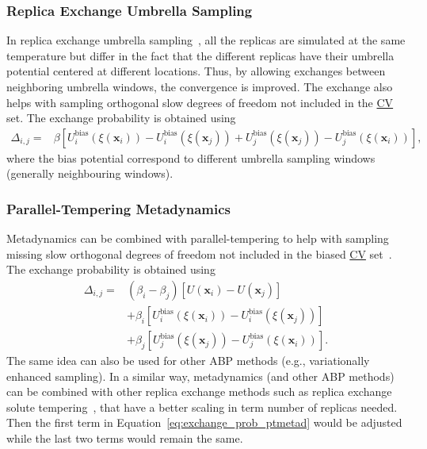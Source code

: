 \documentclass[9pt,review]{livecoms}
\newcommand{\vx}{\mathbf{x}}
\begin{document}
\subsubsection{Replica Exchange Umbrella Sampling}
\label{sec:repex_umbrsampl}
In replica exchange umbrella sampling~\cite{Sugita2000_REUS}, all the replicas are simulated at the same temperature but differ in the fact that the different replicas have their umbrella potential centered at different locations. Thus, by allowing exchanges between neighboring umbrella windows, the convergence is improved. The exchange also helps with sampling orthogonal slow degrees of freedom not included in the \hyperlink{ref:CV} {CV} set. The exchange probability is obtained using
\begin{align}
\Delta_{i,j} = &
\beta \left[
U^{\mathrm{bias}}_{i}(\xi(\vx_{i})) - U^{\mathrm{bias}}_{i}(\xi(\vx_{j})) +
U^{\mathrm{bias}}_{j}(\xi(\vx_{j})) - U^{\mathrm{bias}}_{j}(\xi(\vx_{i}))
\right],
\end{align}
where the bias potential correspond to different umbrella sampling windows (generally neighbouring windows).

\subsubsection{Parallel-Tempering Metadynamics}
Metadynamics can be combined with parallel-tempering to help with sampling missing slow orthogonal degrees of freedom not included in the biased \hyperlink{ref:CV} {CV} set~\cite{Bussi-JACS-2006}. The exchange probability is obtained using
\begin{align}
\label{eq:exchange_prob_ptmetad}
\Delta_{i,j} = &
\left(\beta_{i} - \beta_{j}\right)
\left[U(\vx_{i}) - U(\vx_{j})\right]
\nonumber \\ & +
\beta_{i} \left[
U^{\mathrm{bias}}_{i}(\xi(\vx_{i})) - U^{\mathrm{bias}}_{i}(\xi(\vx_{j}))
\right]
\nonumber \\ & +
\beta_{j} \left[
U^{\mathrm{bias}}_{j}(\xi(\vx_{j})) - U^{\mathrm{bias}}_{j}(\xi(\vx_{i}))
\right].
\end{align}
The same idea can also be used for other ABP methods (e.g., variationally enhanced sampling). In a similar way, metadynamics (and other ABP methods) can be combined with other replica exchange methods such as replica exchange solute tempering~\cite{REST2_Wang_2011,HREX_Bussi_2013}, that have a better scaling in term number of replicas needed. Then the first term in Equation~\ref{eq:exchange_prob_ptmetad} would be adjusted while the last two terms would remain the same.
\end{document}
